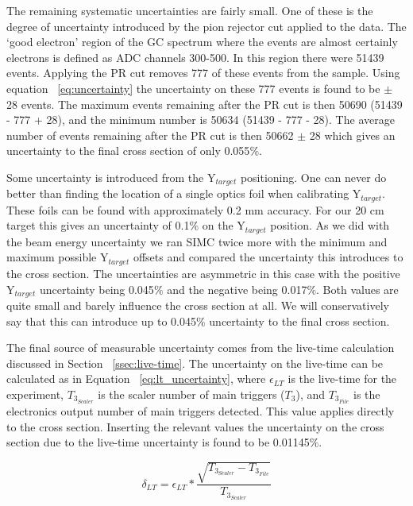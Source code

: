 The remaining systematic uncertainties are fairly small. One of these is the degree of uncertainty introduced by the pion rejector cut applied to the data. The `good electron' region of the GC spectrum where the events are almost certainly electrons is defined as ADC channels 300-500. In this region there were 51439 events. Applying the PR cut removes 777 of these events from the sample. Using equation ~\ref{eq:uncertainty} the uncertainty on these 777 events is found to be $\pm$ 28 events. The maximum events remaining after the PR cut is then 50690 (51439 - 777 + 28), and the minimum number is 50634 (51439 - 777 - 28). The average number of events remaining after the PR cut is then 50662 $\pm$ 28 which gives an uncertainty to the final cross section of only 0.055$\%$.

Some uncertainty is introduced from the Y$_{target}$ positioning. One can never do better than finding the location of a single optics foil when calibrating Y$_{target}$. These foils can be found with approximately 0.2 mm accuracy. For our 20 cm target this gives an uncertainty of 0.1$\%$ on the Y$_{target}$ position. As we did with the beam energy uncertainty we ran SIMC twice more with the minimum and maximum possible Y$_{target}$ offsets and compared the uncertainty this introduces to the cross section. The uncertainties are asymmetric in this case with the positive Y$_{target}$ uncertainty being 0.045$\%$ and the negative being 0.017$\%$. Both values are quite small and barely influence the cross section at all. We will conservatively say that this can introduce up to 0.045$\%$ uncertainty to the final cross section. 

The final source of measurable uncertainty comes from the live-time calculation discussed in Section ~\ref{ssec:live-time}. The uncertainty on the live-time can be calculated as in Equation ~\ref{eq:lt_uncertainty}, where $\epsilon_{LT}$ is the live-time for the experiment, $T_{3_{Scaler}}$ is the scaler number of main triggers ($T_3$), and $T_{3_{File}}$ is the electronics output number of main triggers detected. This value applies directly to the cross section. Inserting the relevant values the uncertainty on the cross section due to the live-time uncertainty is found to be 0.01145$\%$.

\begin{equation} \label{eq:lt_uncertainty}
	\delta_{LT} = \epsilon_{LT} * \frac{\sqrt{T_{3_{Scaler}}-T_{3_{File}}}}{T_{3_{Scaler}}}
\end{equation}

